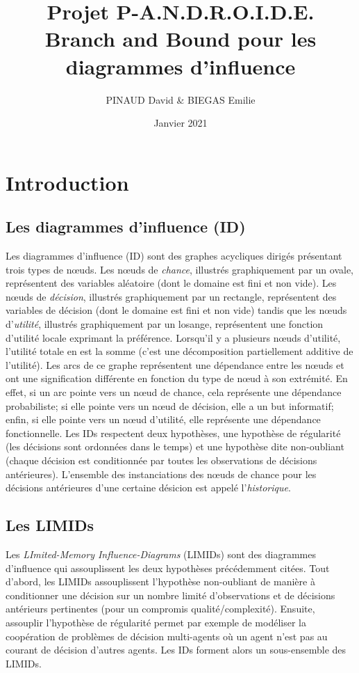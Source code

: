 \documentclass[12pt]{article}
\title{Projet P-A.N.D.R.O.I.D.E.\\
\bigbreak\textbf{Branch and Bound pour les diagrammes d'influence}}
\author{PINAUD David \& BIEGAS Emilie}
\date{Janvier 2021}
\affil{Université Sorbonne Sciences}
\begin{document}
\maketitle

\renewcommand{\contentsname}{Table des Matières}
\pagebreak
\tableofcontents
\pagebreak

\section{Introduction}

\subsection{Les diagrammes d'influence (ID)}
Les diagrammes d'influence (ID) sont des graphes acycliques dirigés présentant trois types de nœuds. 
Les nœuds de \textit{chance}, illustrés graphiquement par un ovale, représentent des variables aléatoire (dont le domaine est fini et non vide). 
Les nœuds de \textit{décision}, illustrés graphiquement par un rectangle, représentent des variables de décision (dont le domaine est fini et non vide) tandis que les nœuds d'\textit{utilité}, illustrés graphiquement par un losange, représentent une fonction d'utilité locale exprimant la préférence.
Lorsqu'il y a plusieurs nœuds d'utilité, l'utilité totale en est la somme (c'est une décomposition partiellement additive de l'utilité).
\bigbreak
Les arcs de ce graphe représentent une dépendance entre les nœuds et ont une signification différente en fonction du type de nœud à son extrémité.
En effet, si un arc pointe vers un nœud de chance, cela représente une dépendance probabiliste; si elle pointe vers un nœud de décision, elle a un but informatif; enfin, si elle pointe vers un nœud d'utilité, elle représente une dépendance fonctionnelle.
\bigbreak
Les IDs respectent deux hypothèses, une hypothèse de régularité (les décisions sont ordonnées dans le temps) et une hypothèse dite non-oubliant (chaque décision est conditionnée par toutes les observations de décisions antérieures).
L'ensemble des instanciations des nœuds de chance pour les décisions antérieures d'une certaine désicion est appelé l'\textit{historique}.


\subsection{Les LIMIDs}
 Les \textit{LImited-Memory Influence-Diagrams} (LIMIDs) sont des diagrammes d'influence qui assouplissent les deux hypothèses précédemment citées. 
 \bigbreak
 Tout d'abord, les LIMIDs assouplissent l'hypothèse non-oubliant de manière à conditionner une décision sur un nombre limité d'observations et de décisions antérieurs pertinentes (pour un compromis qualité/complexité).
\bigbreak
Ensuite, assouplir l'hypothèse de régularité permet par exemple de modéliser la coopération de problèmes de décision multi-agents où un agent n'est pas au courant de décision d'autres agents. 
Les IDs forment alors un sous-ensemble des LIMIDs.
\end{document}
